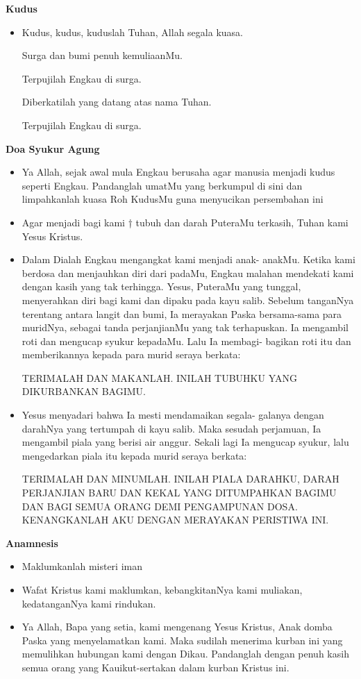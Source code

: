 \documentclass[a5paper,headsepline,titlepage,12pt,nnormalheadings,DIVcalc,twoside]{scrbook}
\makeatletter
\newcommand{\subjudul}[1]{%
  {\parindent \z@ 
    \interlinepenalty\@M \bfseries #1\par\nobreak \vskip 10\p@ }}
\newcommand{\BU}[1]{\begin{itemize} \item[U:] #1 \end{itemize}}
\newcommand{\BI}[1]{\begin{itemize} \item[I:] #1 \end{itemize}}
\makeatother
\begin{document}
 

\subjudul{Kudus}

\BU{Kudus, kudus, kuduslah Tuhan, Allah segala kuasa. 

Surga dan bumi penuh kemuliaanMu. 

Terpujilah Engkau di surga. 

Diberkatilah yang datang atas nama Tuhan. 

Terpujilah Engkau di surga.}

 

\subjudul{Doa Syukur Agung}

\BI{Ya Allah, sejak awal mula Engkau berusaha agar manusia 
menjadi kudus seperti Engkau. Pandanglah umatMu yang 
berkumpul di sini dan limpahkanlah kuasa Roh KudusMu 
guna menyucikan persembahan ini}

\BU{Agar menjadi bagi kami † tubuh dan darah PuteraMu 
terkasih, Tuhan kami Yesus Kristus.}

\BI{Dalam Dialah Engkau mengangkat kami menjadi anak-
anakMu. Ketika kami berdosa dan menjauhkan diri dari 
padaMu, Engkau malahan mendekati kami dengan kasih 
yang tak terhingga. Yesus, PuteraMu yang tunggal, 
menyerahkan diri bagi kami dan dipaku pada kayu salib. 
Sebelum tanganNya terentang antara langit dan bumi, Ia 
merayakan Paska bersama-sama para muridNya, sebagai 
tanda perjanjianMu yang tak terhapuskan. Ia mengambil 
roti dan mengucap syukur kepadaMu. Lalu Ia membagi-
bagikan roti itu dan memberikannya kepada para murid 
seraya berkata: 

TERIMALAH DAN MAKANLAH. INILAH 
TUBUHKU YANG DIKURBANKAN BAGIMU.}

\BI{Yesus menyadari bahwa Ia mesti mendamaikan segala-
galanya dengan darahNya yang tertumpah di kayu salib. 
Maka sesudah perjamuan, Ia mengambil piala yang berisi 
air anggur. Sekali lagi Ia mengucap syukur, lalu 
mengedarkan piala itu kepada murid seraya berkata: 

TERIMALAH DAN MINUMLAH. INILAH PIALA DARAHKU, 
DARAH PERJANJIAN BARU DAN KEKAL YANG 
DITUMPAHKAN BAGIMU DAN BAGI SEMUA ORANG DEMI 
PENGAMPUNAN DOSA. KENANGKANLAH AKU DENGAN 
MERAYAKAN PERISTIWA INI.}

\subjudul{Anamnesis}

\BI{Maklumkanlah misteri iman}

\BU{Wafat Kristus kami maklumkan, kebangkitanNya kami 
muliakan, kedatanganNya kami rindukan.}

\BI{Ya Allah, Bapa yang setia, kami mengenang Yesus Kristus, 
Anak domba Paska yang menyelamatkan kami. Maka 
sudilah menerima kurban ini yang memulihkan hubungan 
kami dengan Dikau. Pandanglah dengan penuh kasih 
semua orang yang Kauikut-sertakan dalam kurban Kristus 
ini.}
\end{document}
